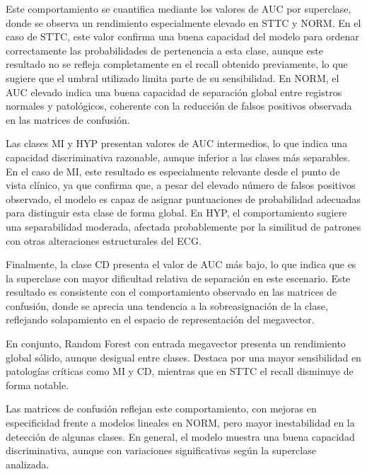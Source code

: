 \documentclass[12pt,a4paper,twoside]{book}
\begin{document}
Este comportamiento se cuantifica mediante los valores de AUC por superclase, donde se observa un rendimiento especialmente elevado en STTC y NORM. 
En el caso de STTC, este valor confirma una buena capacidad del modelo para ordenar correctamente las probabilidades de pertenencia a esta clase, aunque este resultado no se refleja completamente en el recall obtenido previamente, lo que sugiere que el umbral utilizado limita parte de su sensibilidad. 
En NORM, el AUC elevado indica una buena capacidad de separación global entre registros normales y patológicos, coherente con la reducción de falsos positivos observada en las matrices de confusión.

Las clases MI y HYP presentan valores de AUC intermedios, lo que indica una capacidad discriminativa razonable, aunque inferior a las clases más separables. 
En el caso de MI, este resultado es especialmente relevante desde el punto de vista clínico, ya que confirma que, a pesar del elevado número de falsos positivos observado, el modelo es capaz de asignar puntuaciones de probabilidad adecuadas para distinguir esta clase de forma global. 
En HYP, el comportamiento sugiere una separabilidad moderada, afectada probablemente por la similitud de patrones con otras alteraciones estructurales del ECG.

Finalmente, la clase CD presenta el valor de AUC más bajo, lo que indica que es la superclase con mayor dificultad relativa de separación en este escenario. 
Este resultado es consistente con el comportamiento observado en las matrices de confusión, donde se aprecia una tendencia a la sobreasignación de la clase, reflejando solapamiento en el espacio de representación del megavector.

\vspace{0.5cm}

En conjunto, Random Forest con entrada megavector presenta un rendimiento global sólido, aunque desigual entre clases. 
Destaca por una mayor sensibilidad en patologías críticas como MI y CD, mientras que en STTC el recall disminuye de forma notable.

Las matrices de confusión reflejan este comportamiento, con mejoras en especificidad frente a modelos lineales en NORM, pero mayor inestabilidad en la detección de algunas clases. 
En general, el modelo muestra una buena capacidad discriminativa, aunque con variaciones significativas según la superclase analizada.

\vspace{0.5cm}
\end{document}
